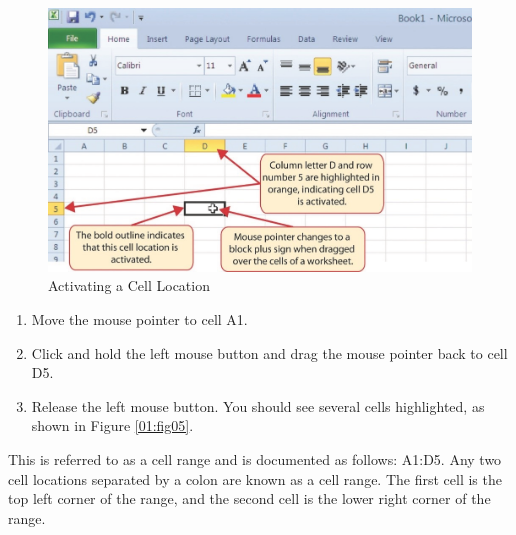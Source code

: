 \begin{figure}[H]
	\centering
	\includegraphics[width=\maxwidth{.95\linewidth}]{gfx/ch01_fig04}
	\caption{Activating a Cell Location}
	\label{01:fig04}
\end{figure}

\begin{enumerate}
	\item Move the mouse pointer to cell \textsf{A1}.
	\item Click and hold the left mouse button and drag the mouse pointer back to cell \textsf{D5}.
	\item Release the left mouse button. You should see several cells highlighted, as shown in Figure \ref{01:fig05}.
\end{enumerate}

This is referred to as a cell range and is documented as follows: \textsf{A1:D5}. Any two cell locations separated by a colon are known as a cell range. The first cell is the top left corner of the range, and the second cell is the lower right corner of the range.


